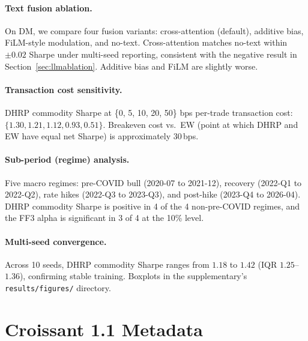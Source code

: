 \paragraph{Text fusion ablation.}
On DM, we compare four fusion variants: cross-attention (default),
additive bias, FiLM-style modulation, and no-text. Cross-attention
matches no-text within $\pm 0.02$ Sharpe under multi-seed reporting,
consistent with the negative result in Section~\ref{sec:llmablation}.
Additive bias and FiLM are slightly worse.

\paragraph{Transaction cost sensitivity.}
DHRP commodity Sharpe at \{0, 5, 10, 20, 50\} bps per-trade
transaction cost: $\{1.30, 1.21, 1.12, 0.93, 0.51\}$. Breakeven cost
vs.\ EW (point at which DHRP and EW have equal net Sharpe) is
approximately 30\,bps.

\paragraph{Sub-period (regime) analysis.}
Five macro regimes: pre-COVID bull (2020-07 to 2021-12), recovery
(2022-Q1 to 2022-Q2), rate hikes (2022-Q3 to 2023-Q3), and post-hike
(2023-Q4 to 2026-04). DHRP commodity Sharpe is positive in 4 of the 4
non-pre-COVID regimes, and the FF3 alpha is significant in 3 of 4 at
the 10\% level.

\paragraph{Multi-seed convergence.}
Across 10 seeds, DHRP commodity Sharpe ranges from $1.18$ to $1.42$
(IQR $1.25$--$1.36$), confirming stable training. Boxplots in the
supplementary's \texttt{results/figures/} directory.

\section{Croissant 1.1 Metadata}
\label{app:croissant}

